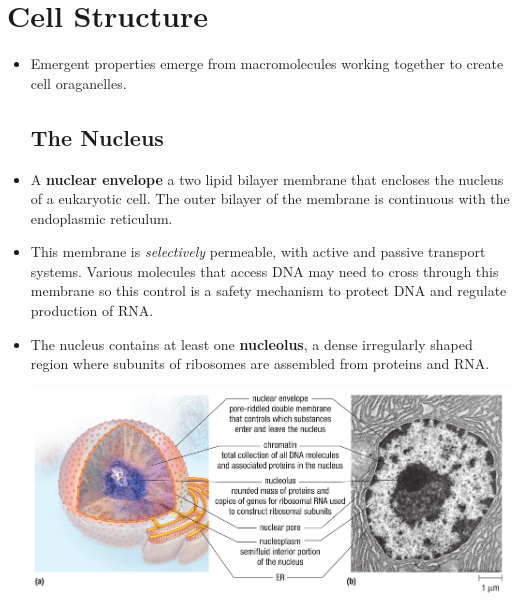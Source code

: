 \documentclass[letterpaper]{article}
\numberwithin{equation}{section}
\theoremstyle{classic}
\begin{document}
\section{Cell Structure}
\begin{itemize}
    \item Emergent properties emerge from macromolecules working together to create cell oraganelles.
    \subsection{The Nucleus}
    \item A \textbf{nuclear envelope} a two lipid bilayer membrane that encloses the nucleus of a eukaryotic cell. The outer bilayer of the membrane is continuous with the endoplasmic reticulum.
    \item This membrane is \textit{selectively} permeable, with active and passive transport systems. Various molecules that access DNA may need to cross through this membrane so this control is a safety mechanism to protect DNA and regulate production of RNA.
    \item The nucleus contains at least one \textbf{nucleolus}, a dense irregularly shaped region where subunits of ribosomes are assembled from proteins and RNA.
    \begin{center}\includegraphics[width=0.9\linewidth]{A10.PNG}\end{center}

\end{itemize}
\end{document}
